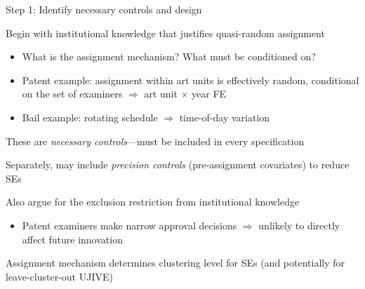 \documentclass[notes,11pt, aspectratio=169]{beamer}
\newenvironment{wideitemize}{\itemize\addtolength{\itemsep}{10pt}}{\enditemize}
\begin{document}
\begin{frame}{Step 1: Identify necessary controls and design}
  \begin{wideitemize}
  \item Begin with institutional knowledge that justifies quasi-random assignment
    \begin{itemize}
    \item What is the assignment mechanism? What must be conditioned on?
    \item Patent example: assignment within art units is effectively random, conditional on the set of examiners $\Rightarrow$ art unit $\times$ year FE
    \item Bail example: rotating schedule $\Rightarrow$ time-of-day variation
    \end{itemize}
  \item These are \emph{necessary controls}---must be included in every specification
  \item Separately, may include \emph{precision controls} (pre-assignment covariates) to reduce SEs
  \item Also argue for the exclusion restriction from institutional knowledge
    \begin{itemize}
    \item Patent examiners make narrow approval decisions $\Rightarrow$ unlikely to directly affect future innovation
    \end{itemize}
  \item Assignment mechanism determines clustering level for SEs (and potentially for leave-cluster-out UJIVE)
  \end{wideitemize}
\end{frame}
\end{document}
